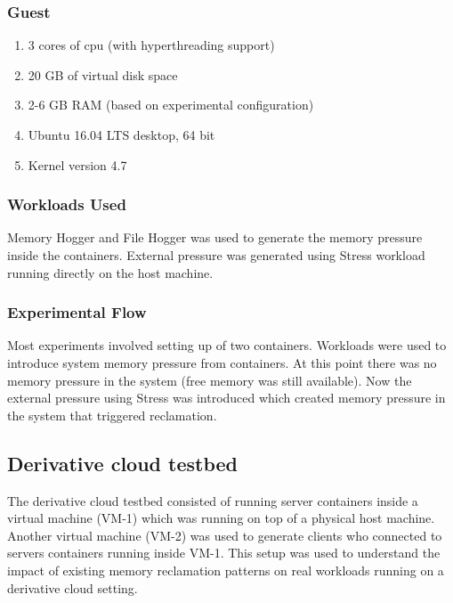       \subsubsection{Guest}
	
	\begin{enumerate}
	  \item 3 cores of cpu (with hyperthreading support)
	  \item 20 GB of virtual disk space
	  \item 2-6 GB RAM (based on experimental configuration)
	  \item Ubuntu 16.04 LTS desktop, 64 bit
	  \item Kernel version 4.7
	\end{enumerate}
	
      \subsubsection{Workloads Used}
	
	Memory Hogger and File Hogger was used to generate the memory pressure inside the containers. External pressure was generated 
using Stress workload running directly on the host machine.

      \subsubsection{Experimental Flow}
	
	Most experiments involved setting up of two containers. Workloads were used to introduce system memory pressure from containers. At 
this point there was no memory pressure in the system (free memory was still available). Now the external pressure using Stress was 
introduced which created memory pressure in the system that triggered reclamation. 

    \subsection{Derivative cloud testbed}
      \label{section_testbed_derivative}
      
       The derivative cloud testbed consisted of running server containers inside a virtual machine (VM-1) which was running on top of a 
physical host machine. Another virtual machine (VM-2) was used to generate clients who connected to servers containers running inside VM-1. 
This setup was used to understand the impact of existing memory reclamation patterns on real workloads running on a derivative cloud 
setting.
	
